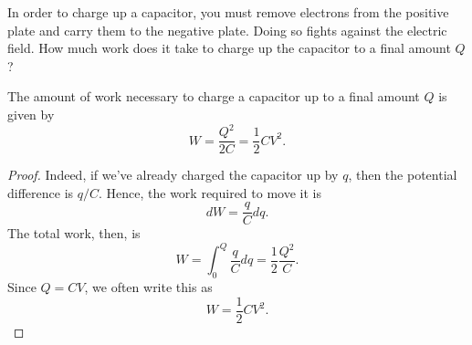 In order to charge up a capacitor, you must remove electrons from the positive plate and carry them to the negative plate. Doing so fights against the electric field. How much work does it take to charge up the capacitor to a final amount $Q$?

\begin{proposition}
The amount of work necessary to charge a capacitor up to a final amount $Q$ is given by
\[W=\frac{Q^2}{2C}=\frac{1}{2}CV^2.\]
\end{proposition}

\begin{proof}
Indeed, if we've already charged the capacitor up by $q$, then the potential difference is $q/C$. Hence, the work required to move it is
\[dW=\frac{q}{C}dq.\]
The total work, then, is
\[W=\int_{0}^Q\frac{q}{C}dq=\frac{1}{2}\frac{Q^2}{C}.\]
Since $Q=CV$, we often write this as
\[W=\frac{1}{2}CV^2.\]
\end{proof}
